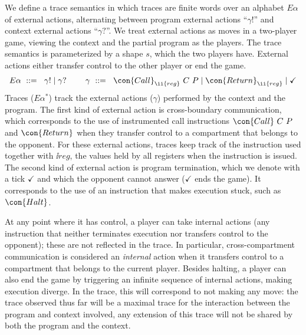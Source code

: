 \documentclass[10pt, conference, compsocconf, letterpaper, times]{IEEEtran}
\begin{document}
We define a trace semantics in which traces are finite words over an
alphabet $E\alpha$\ifsooner{}\fi{}
of external actions, alternating between program external
actions ``$\gamma!$'' and context external actions ``$\gamma?$''.
We treat external actions as moves in a two-player game, viewing
the context and the partial program as the players.
The trace semantics is parameterized by a shape $s$, which the two
players have.
External actions either transfer control to the other player or end
the game.
\[
  \begin{array}{r@{}l@{~~~~~~~}r@{}l}
  E\alpha\  \mathrel{::=}\; \ \;&
    \gamma!
    \;|\;
    \gamma?
  &
  \gamma \ \mathrel{::=}\; \ \;&
    \con{Call}_{\ii{reg}}~C~P
    \;|\;
    \con{Return}_{\ii{reg}}
    \;|\;
    \checkmark
  \end{array}
\]
Traces ($E\alpha^*$) track the external actions ($\gamma$)
performed by the context and the program.
The first kind of external action is cross-boundary communication,
which corresponds to the use of instrumented call instructions
$\con{Call}~C~P$ and $\con{Return}$ when they transfer control to
a compartment that belongs to the opponent.
For these external actions, traces keep track of the instruction used
together with $\ii{reg}$, the values held by all registers when the
instruction is issued.
The second kind of external action is program termination,
which we denote with a tick $\checkmark$ and which the opponent cannot
answer ($\checkmark$ ends the game).
It corresponds to the use of an instruction that makes execution
stuck, such as $\con{Halt}$.

At any point where it has control, a player can take internal actions
(any instruction that
neither terminates execution nor transfers control to the opponent);  
these are not reflected in the trace.
In particular, cross-compartment communication is considered an
{\em internal} action when it transfers control to a compartment that
belongs to the current player.
Besides halting, a player can also end the game by triggering an infinite
sequence of internal actions, making execution diverge.
In the trace, this will correspond to not making any move:
the trace observed thus far will be a maximal trace for the
interaction between the program and context involved, \IE any
extension of this trace will not be shared by both the program and the
context.
\end{document}
